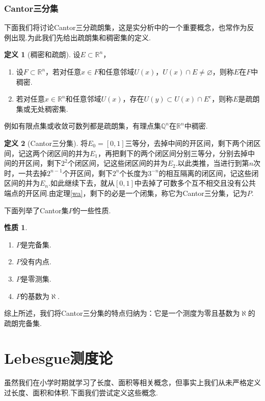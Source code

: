 \documentclass[lang=cn,12pt]{ctexart}
\theoremstyle{definition}
\newtheorem{definition}{定义}
\newtheorem{proposition}{性质}
\theoremstyle{plain}
\begin{document}
\section{Cantor三分集}
下面我们将讨论Cantor三分疏朗集，这是实分析中的一个重要概念，也常作为反例出现.为此我们先给出疏朗集和稠密集的定义.
\begin{definition}[稠密和疏朗]
	设$E\subset\mathbb{R}^n$，
	\begin{enumerate}
		\item 设$F\subset\mathbb{R}^n$，若对任意$x\in F$和任意邻域$U(x)$，$U(x)\cap E\neq\varnothing$，则称$E$在$F$中{\heiti 稠密}.
		\item 若对任意$x\in\mathbb{R}^n$和任意邻域$U(x)$，存在$U(y)\subset U(x)\cap E^c$，则称$E$是{\heiti 疏朗集}或{\heiti 无处稠密集}.
	\end{enumerate}
\end{definition}
例如有限点集或收敛可数列都是疏朗集，有理点集$\mathbb{Q}^n$在$\mathbb{R}^n$中稠密.
\begin{definition}[Cantor三分集]
	将$E_0=\left[0,1\right]$三等分，去掉中间的开区间，剩下两个闭区间，记这两个闭区间的并为$E_1$，再把剩下的两个闭区间分别三等分，分别去掉中间的开区间，剩下$2^2$个闭区间，记这些闭区间的并为$E_2$.以此类推，当进行到第$n$次时，一共去掉$2^{n-1}$个开区间，剩下$2^n$个长度为$3^{-n}$的相互隔离的闭区间，记这些闭区间的并为$E_n$.如此继续下去，就从$\left[0,1\right]$中去掉了可数多个互不相交且没有公共端点的开区间.由定理\ref{wa}，剩下的必是一个闭集，称它为{\heiti Cantor三分集}，记为$P$.
\end{definition}
下面列举了Cantor集$P$的一些性质.
\begin{proposition}
	\begin{enumerate}
		\item $P$是完备集.
		\item $P$没有内点.
		\item $P$是零测集.
		\item $P$的基数为$\aleph$.
	\end{enumerate}
\end{proposition}

综上所述，我们将Cantor三分集的特点归纳为：它是一个测度为零且基数为$\aleph$的疏朗完备集.
\newpage

\part{Lebesgue测度论}
虽然我们在小学时期就学习了长度、面积等相关概念，但事实上我们从未严格定义过长度、面积和体积.下面我们尝试定义这些概念.
\end{document}
